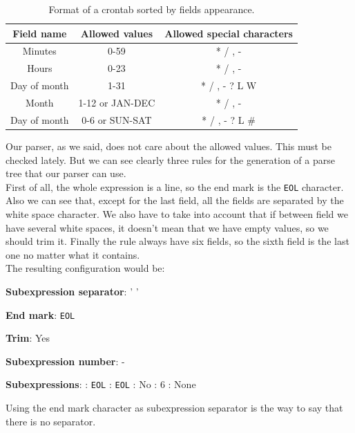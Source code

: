 \begin{table}[h]
  \begin{center}
    \begin{tabular}{| c | c | c | }
      \hline
      {\bf Field name} & {\bf Allowed values} & {\bf Allowed special characters} \\ \hline
      Minutes & 0-59 & * / , - \\ \hline
      Hours & 0-23 & * / , - \\ \hline
      Day of month & 1-31 & * / , - ? L W \\ \hline
      Month & 1-12 or JAN-DEC & * / , - \\ \hline
      Day of month & 0-6 or SUN-SAT & * / , - ? L \# \\ \hline
    \end{tabular}
    \caption{Format of a crontab sorted by fields appearance.}
    \label{tab:crontab}
  \end{center}
\end{table}
Our parser, as we said, does not care about the allowed values. This must be checked lately. But we can see clearly three rules for the
generation of a parse tree that our parser can use.\\
First of all, the whole expression is a line, so the end mark is the \texttt{EOL} character.\\
Also we can see that, except for the last field, all the fields are separated by the white space character. We also have to take into
account that if between field we have several white spaces, it doesn't mean that we have empty values, so we should trim it.
Finally the rule always have six fields, so the sixth field is the last one no matter what it contains.\\
The resulting configuration would be:
\begin{list}{-}{}
  \item {\bf Subexpression separator}: ' '
  \item {\bf End mark}: \texttt{EOL}
  \item {\bf Trim}: Yes
  \item {\bf Subexpression number}: -
  \item {\bf Subexpressions}:
    : \texttt{EOL}
    : \texttt{EOL}
    : No
    : 6
    : None
\end{list}
Using the end mark character as subexpression separator is the way to say that there is no separator.
